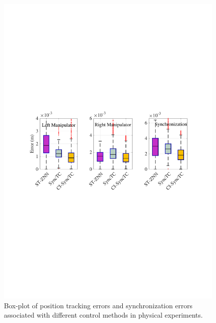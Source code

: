 \documentclass[journal,twoside,web]{ieeecolor}
\begin{document}
\begin{figure}[!t]
    \centering
    \includegraphics[width=1\linewidth]{figures/experiment/FIG10_TII-24-5492.pdf}
    \caption{Box-plot of position tracking errors and synchronization errors associated with different control methods in physical experiments.
    }
    \label{Fig:experiment:comparison}
\end{figure}
\end{document}
